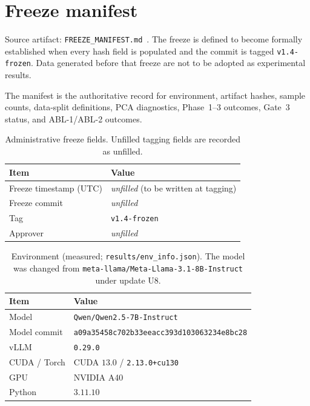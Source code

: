 \documentclass{article}
\begin{document}
\section{Freeze manifest}
\label{app:freeze}

Source artifact: \texttt{FREEZE\_MANIFEST.md}~\citep{exptrj001freeze}.
The freeze is defined to become formally established when every hash field is populated and the commit is tagged \texttt{v1.4-frozen}. Data generated before that freeze are not to be adopted as experimental results.

The manifest is the authoritative record for environment, artifact hashes, sample counts, data-split definitions, {PCA} diagnostics, Phase~1--3 outcomes, Gate~3 status, and {ABL-1}/{ABL-2} outcomes.

\begin{table}[t]
\centering
\caption{Administrative freeze fields. Unfilled tagging fields are recorded as unfilled.}
\label{tab:freeze-admin}
\small
\begin{tabular}{@{}ll@{}}
\toprule
Item & Value \\
\midrule
Freeze timestamp ({UTC}) & \emph{unfilled} (to be written at tagging) \\
Freeze commit & \emph{unfilled} \\
Tag & \texttt{v1.4-frozen} \\
Approver & \emph{unfilled} \\
\bottomrule
\end{tabular}
\end{table}

\begin{table}[t]
\centering
\caption{Environment (measured; \texttt{results/env\_info.json}). The model was changed from \texttt{meta-llama/Meta-Llama-3.1-8B-Instruct} under update {U8}.}
\label{tab:freeze-env}
\small
\begin{tabular}{@{}ll@{}}
\toprule
Item & Value \\
\midrule
Model & \texttt{Qwen/Qwen2.5-7B-Instruct} \\
Model commit & \texttt{a09a35458c702b33eeacc393d103063234e8bc28} \\
vLLM & \texttt{0.29.0} \\
{CUDA} / Torch & {CUDA} $13.0$ / \texttt{2.13.0+cu130} \\
{GPU} & {NVIDIA A40} \\
Python & $3.11.10$ \\
\bottomrule
\end{tabular}
\end{table}
\end{document}

